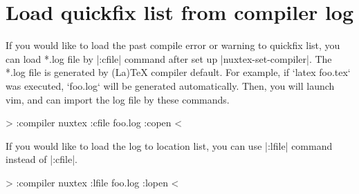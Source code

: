 \section{Load quickfix list from compiler log}


If you would like to load the past compile error or warning to quickfix list, you can load *.log file by |:cfile| command after set up |nuxtex-set-compiler|.  The *.log file is generated by (La)TeX compiler default. For example, if `latex foo.tex` was executed, `foo.log` will be generated automatically. Then, you will launch vim, and can import the log file by these commands.

>
	:compiler nuxtex
	:cfile foo.log
	:copen
<

If you would like to load the log to location list, you can use |:lfile|
command instead of |:cfile|.

>
	:compiler nuxtex
	:lfile foo.log
	:lopen
<


